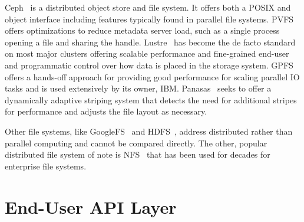 \documentclass{sig-alt-gov2}
\begin{document}
Ceph~\cite{weil:ceph} is a distributed object store and file system. It offers
both a POSIX and object interface including features typically found in parallel
file systems.
PVFS~\cite{carns:pvfs} offers optimizations to reduce metadata server load,
such as a single process opening a file and sharing the handle.
Lustre~\cite{braam:lustre-arch} has become the de facto standard on most major
clusters offering scalable performance and fine-grained end-user and
programmatic control over how data is placed in the storage system.
GPFS~\cite{schmuck:gpfs} offers a hands-off approach for providing good
performance for scaling parallel IO tasks and is used extensively by its owner,
IBM.
Panasas~\cite{panasas:architecture} seeks to offer a dynamically adaptive
striping system that detects the need for additional stripes for performance
and adjusts the file layout as necessary.

Other file systems, like GoogleFS~\cite{ghemawat:googlefs} and
HDFS~\cite{Shvachko:2010:hdfs}, address distributed rather than parallel
computing and cannot be compared directly.
The other, popular distributed
file system of note is NFS~\cite{powlowski:1994:nfs3} that has been used for
decades for enterprise file systems.

\section{End-User API Layer}
\label{sec:end-user}
\end{document}
